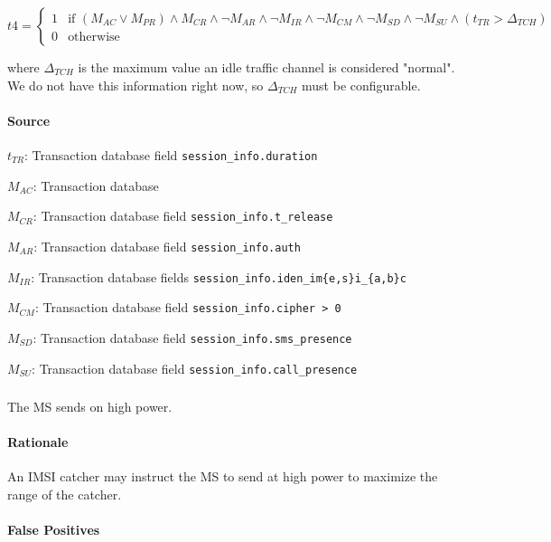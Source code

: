\documentclass[a4paper,11pt,notitlepage,bigheadings,oneside]{scrartcl}
\begin{document}
$t4 =
\begin{cases}
	1 & \text{if } (M_{AC} \vee M_{PR}) \wedge M_{CR} \wedge \neg M_{AR} \wedge \neg M_{IR} \wedge \neg M_{CM} \wedge \neg M_{SD} \wedge \neg M_{SU} \wedge (t_{TR} > \Delta_{TCH}) \\
	0 & \text{otherwise}
\end{cases}$

where $\Delta_{TCH}$ is the maximum value an idle traffic channel is considered
"normal". We do not have this information right now, so $\Delta_{TCH}$ must be
configurable.

\paragraph{Source}

$t_{TR}$: Transaction database field \verb|session_info.duration|

$M_{AC}$: Transaction database


$M_{CR}$: Transaction database field \verb|session_info.t_release|

$M_{AR}$: Transaction database field \verb|session_info.auth|

$M_{IR}$: Transaction database fields \verb|session_info.iden_im{e,s}i_{a,b}c|

$M_{CM}$: Transaction database field \verb|session_info.cipher > 0|

$M_{SD}$: Transaction database field \verb|session_info.sms_presence|

$M_{SU}$: Transaction database field \verb|session_info.call_presence|

\subsubsection{}

The MS sends on high power.

\paragraph{Rationale}

An IMSI catcher may instruct the MS to send at high power to maximize the range
of the catcher.

\paragraph{False Positives}
\end{document}

